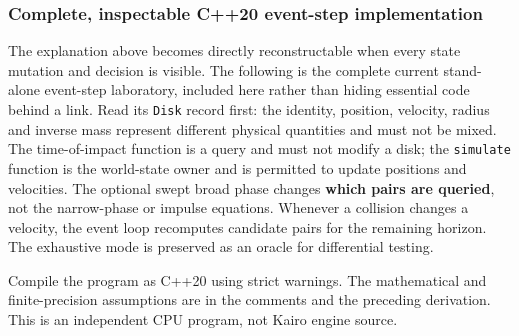 \subsubsection{Complete, inspectable C++20 event-step implementation}\label{06-engine-ii-ch046-complete-inspectable-c20-event-step-implementation}

\hypertarget{06-engine-ii-ch046-complete-inspectable-c20-event-step-implementation}{}

The explanation above becomes directly reconstructable when every state mutation and decision is visible. The following is the complete current stand-alone event-step laboratory, included here rather than hiding essential code behind a link. Read its \texttt{Disk} record first: the identity, position, velocity, radius and inverse mass represent different physical quantities and must not be mixed. The time-of-impact function is a query and must not modify a disk; the \texttt{simulate} function is the world-state owner and is permitted to update positions and velocities. The optional swept broad phase changes \textbf{which pairs are queried}, not the narrow-phase or impulse equations. Whenever a collision changes a velocity, the event loop recomputes candidate pairs for the remaining horizon. The exhaustive mode is preserved as an oracle for differential testing.

Compile the program as C++20 using strict warnings. The mathematical and finite-precision assumptions are in the comments and the preceding derivation. This is an independent CPU program, not Kairo engine source.

